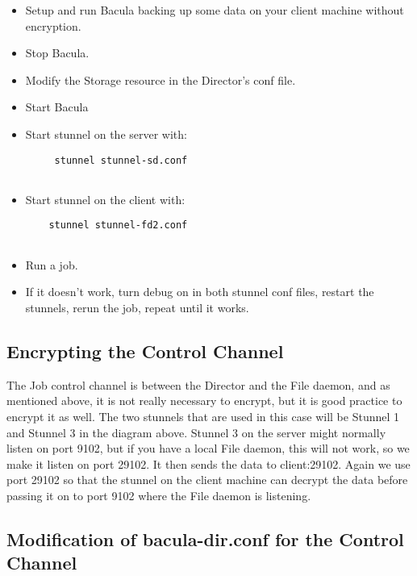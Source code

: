 \begin{itemize}
\item Setup and run Bacula backing up some data on your  client machine
   without encryption.  
\item Stop Bacula.  
\item Modify the Storage resource in the Director's conf  file.  
\item Start Bacula  
\item Start stunnel on the server with:  

   \footnotesize
\begin{verbatim}
     stunnel stunnel-sd.conf
  
\end{verbatim}
\normalsize

\item Start stunnel on the client with:  

   \footnotesize
\begin{verbatim}
    stunnel stunnel-fd2.conf
  
\end{verbatim}
\normalsize

\item Run a job.  
\item If it doesn't work, turn debug on in both stunnel conf files,  restart
   the stunnels, rerun the job, repeat until it works. 
   \end{itemize}

\subsection*{Encrypting the Control Channel}

The Job control channel is between the Director and the File daemon, and as
mentioned above, it is not really necessary to encrypt, but it is good
practice to encrypt it as well. The two stunnels that are used in this case
will be Stunnel 1 and Stunnel 3 in the diagram above. Stunnel 3 on the server
might normally listen on port 9102, but if you have a local File daemon, this
will not work, so we make it listen on port 29102. It then sends the data to
client:29102. Again we use port 29102 so that the stunnel on the client
machine can decrypt the data before passing it on to port 9102 where the File
daemon is listening. 

\subsection*{Modification of bacula-dir.conf for the Control Channel}

